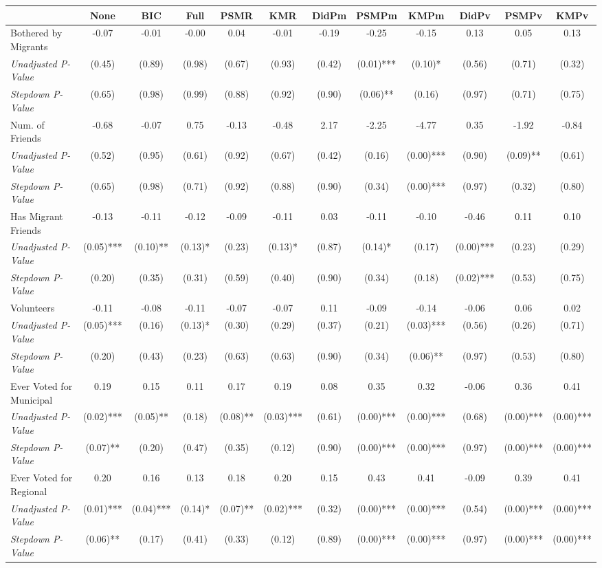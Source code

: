 \begin{tabular}{l c c c c c c c c c c c}
\toprule
 & None & BIC & Full & PSMR & KMR & DidPm & PSMPm & KMPm & DidPv & PSMPv & KMPv \\
\midrule
Bothered by Migrants & -0.07 & -0.01 & -0.00 & 0.04 & -0.01 & -0.19 & -0.25 & -0.15 & 0.13 & 0.05 & 0.13 \\
\quad \textit{Unadjusted P-Value} & (0.45) & (0.89) & (0.98) & (0.67) & (0.93) & (0.42) & (0.01)*** & (0.10)* & (0.56) & (0.71) & (0.32) \\
\quad \textit{Stepdown P-Value} & (0.65) & (0.98) & (0.99) & (0.88) & (0.92) & (0.90) & (0.06)** & (0.16) & (0.97) & (0.71) & (0.75) \\
Num. of Friends & -0.68 & -0.07 & 0.75 & -0.13 & -0.48 & 2.17 & -2.25 & -4.77 & 0.35 & -1.92 & -0.84 \\
\quad \textit{Unadjusted P-Value} & (0.52) & (0.95) & (0.61) & (0.92) & (0.67) & (0.42) & (0.16) & (0.00)*** & (0.90) & (0.09)** & (0.61) \\
\quad \textit{Stepdown P-Value} & (0.65) & (0.98) & (0.71) & (0.92) & (0.88) & (0.90) & (0.34) & (0.00)*** & (0.97) & (0.32) & (0.80) \\
Has Migrant Friends & -0.13 & -0.11 & -0.12 & -0.09 & -0.11 & 0.03 & -0.11 & -0.10 & -0.46 & 0.11 & 0.10 \\
\quad \textit{Unadjusted P-Value} & (0.05)*** & (0.10)** & (0.13)* & (0.23) & (0.13)* & (0.87) & (0.14)* & (0.17) & (0.00)*** & (0.23) & (0.29) \\
\quad \textit{Stepdown P-Value} & (0.20) & (0.35) & (0.31) & (0.59) & (0.40) & (0.90) & (0.34) & (0.18) & (0.02)*** & (0.53) & (0.75) \\
Volunteers & -0.11 & -0.08 & -0.11 & -0.07 & -0.07 & 0.11 & -0.09 & -0.14 & -0.06 & 0.06 & 0.02 \\
\quad \textit{Unadjusted P-Value} & (0.05)*** & (0.16) & (0.13)* & (0.30) & (0.29) & (0.37) & (0.21) & (0.03)*** & (0.56) & (0.26) & (0.71) \\
\quad \textit{Stepdown P-Value} & (0.20) & (0.43) & (0.23) & (0.63) & (0.63) & (0.90) & (0.34) & (0.06)** & (0.97) & (0.53) & (0.80) \\
Ever Voted for Municipal & 0.19 & 0.15 & 0.11 & 0.17 & 0.19 & 0.08 & 0.35 & 0.32 & -0.06 & 0.36 & 0.41 \\
\quad \textit{Unadjusted P-Value} & (0.02)*** & (0.05)** & (0.18) & (0.08)** & (0.03)*** & (0.61) & (0.00)*** & (0.00)*** & (0.68) & (0.00)*** & (0.00)*** \\
\quad \textit{Stepdown P-Value} & (0.07)** & (0.20) & (0.47) & (0.35) & (0.12) & (0.90) & (0.00)*** & (0.00)*** & (0.97) & (0.00)*** & (0.00)*** \\
Ever Voted for Regional & 0.20 & 0.16 & 0.13 & 0.18 & 0.20 & 0.15 & 0.43 & 0.41 & -0.09 & 0.39 & 0.41 \\
\quad \textit{Unadjusted P-Value} & (0.01)*** & (0.04)*** & (0.14)* & (0.07)** & (0.02)*** & (0.32) & (0.00)*** & (0.00)*** & (0.54) & (0.00)*** & (0.00)*** \\
\quad \textit{Stepdown P-Value} & (0.06)** & (0.17) & (0.41) & (0.33) & (0.12) & (0.89) & (0.00)*** & (0.00)*** & (0.97) & (0.00)*** & (0.00)*** \\
\bottomrule
\end{tabular}
